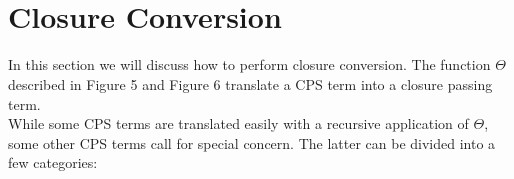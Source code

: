 \documentclass{article}
\theoremstyle{definition}
\theoremstyle{remark}
\numberwithin{equation}{section}
\begin{document}
\\\\

\section{Closure Conversion}

In this section we will discuss how to perform closure conversion.
The function $\Theta$ described in Figure 5 and Figure 6 translate a CPS term
into a closure passing term.\\

While some CPS terms are translated easily with a recursive application of
$\Theta$, some other CPS terms call for special concern. The latter can be
divided into a few categories:
\end{document}

